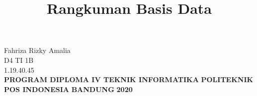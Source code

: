 \documentclass{article}
\begin{document}
\title{\huge\textbf{Rangkuman Basis Data}}
\date{}


\maketitle



\begin{center}
\vspace{4cm}
Fahriza Rizky Amalia\\
D4 TI 1B\\
1.19.40.45\\
\vspace{4cm}
\textbf{PROGRAM DIPLOMA IV TEKNIK INFORMATIKA} \linebreak
\textbf{POLITEKNIK POS INDONESIA} \linebreak
\textbf{BANDUNG}\linebreak
\textbf{2020}

\end{center}
\newpage
\end{document}
